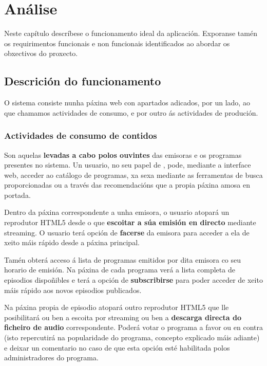 \chapter[Análise]{
  \label{chp:analise}
  Análise
}
\minitoc
\newpage

Neste capítulo descríbese o funcionamento ideal da aplicación. Exporanse tamén os requirimentos funcionais e non funcionais identificados ao abordar os obxectivos do proxecto. 

\section{Descrición do funcionamento}

O sistema consiste nunha páxina web con apartados adicados, por un lado, ao que chamamos actividades de consumo, e por outro ás actividades de produción.

\subsection{Actividades de consumo de contidos}

Son aquelas \textbf{levadas a cabo polos ouvintes} das emisoras e os programas presentes no sistema. Un usuario, no seu papel de , pode, mediante a interface web, acceder ao catálogo de programas, xa sexa mediante as ferramentas de busca proporcionadas ou a través das recomendacións que a propia páxina amosa en portada.

Dentro da páxina correspondente a unha emisora, o usuario atopará un reprodutor HTML5 desde o que \textbf{escoitar a súa emisión en directo} mediante streaming. O usuario terá opción de \textbf{facerse } da emisora para acceder a ela de xeito máis rápido desde a páxina principal.

Tamén obterá acceso á lista de programas emitidos por dita emisora co seu horario de emisión. Na páxina de cada programa verá a lista completa de episodios dispoñibles e terá a opción de \textbf{subscribirse} para poder acceder de xeito máis rápido aos novos episodios publicados.

Na páxina propia de episodio atopará outro reprodutor HTML5 que lle posibilitará ou ben a escoita por streaming ou ben a \textbf{descarga directa do ficheiro de audio} correspondente. Poderá votar o programa a favor ou en contra (isto repercutirá na popularidade do programa, concepto explicado máis adiante) e deixar un comentario no caso de que esta opción esté habilitada polos administradores do programa.


